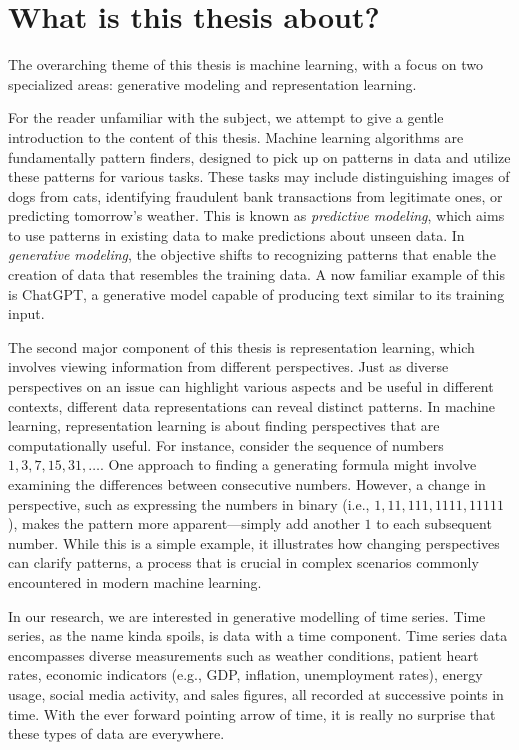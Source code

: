 \documentclass[../../thesis.tex]{subfiles}
\begin{document}
\section{What is this thesis about?}

The overarching theme of this thesis is machine learning, with a focus on two specialized areas: generative modeling and representation learning.\newline

For the reader unfamiliar with the subject, we attempt to give a gentle introduction to the content of this thesis. Machine learning algorithms are fundamentally pattern finders, designed to pick up on patterns in data and utilize these patterns for various tasks. These tasks may include distinguishing images of dogs from cats, identifying fraudulent bank transactions from legitimate ones, or predicting tomorrow's weather. This is known as \textit{predictive modeling}, which aims to use patterns in existing data to make predictions about unseen data. In \textit{generative modeling}, the objective shifts to recognizing patterns that enable the creation of data that resembles the training data. A now familiar example of this is ChatGPT, a generative model capable of producing text similar to its training input.\newline

The second major component of this thesis is representation learning, which involves viewing information from different perspectives. Just as diverse perspectives on an issue can highlight various aspects and be useful in different contexts, different data representations can reveal distinct patterns. In machine learning, representation learning is about finding perspectives that are computationally useful. For instance, consider the sequence of numbers $1, 3, 7, 15, 31, \dots$. One approach to finding a generating formula might involve examining the differences between consecutive numbers. However, a change in perspective, such as expressing the numbers in binary (i.e., $1, 11, 111, 1111, 11111$), makes the pattern more apparent—simply add another $1$ to each subsequent number. While this is a simple example, it illustrates how changing perspectives can clarify patterns, a process that is crucial in complex scenarios commonly encountered in modern machine learning.\newline

In our research, we are interested in generative modelling of time series. Time series, as the name kinda spoils, is data with a time component. Time series data encompasses diverse measurements such as weather conditions, patient heart rates, economic indicators (e.g., GDP, inflation, unemployment rates), energy usage, social media activity, and sales figures, all recorded at successive points in time. With the ever forward pointing arrow of time, it is really no surprise that these types of data are everywhere. \newline
\end{document}
